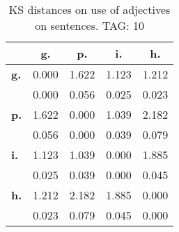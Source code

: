 \begin{table}[h!]
\begin{center}
\begin{tabular}{| l || c | c | c | c |}\hline
 & {\bf g.} & {\bf p.} & {\bf i.} & {\bf h.} \\\hline\hline
{\bf g.} & 0.000 & 1.622 & 1.123 & 1.212 \\
{\bf } & 0.000 & 0.056 & 0.025 & 0.023 \\\hline
{\bf p.} & 1.622 & 0.000 & 1.039 & 2.182 \\
{\bf } & 0.056 & 0.000 & 0.039 & 0.079 \\\hline
{\bf i.} & 1.123 & 1.039 & 0.000 & 1.885 \\
{\bf } & 0.025 & 0.039 & 0.000 & 0.045 \\\hline
{\bf h.} & 1.212 & 2.182 & 1.885 & 0.000 \\
{\bf } & 0.023 & 0.079 & 0.045 & 0.000 \\\hline
\end{tabular}
\caption{KS distances on use of adjectives on sentences. TAG: 10}
\end{center}
\end{table}